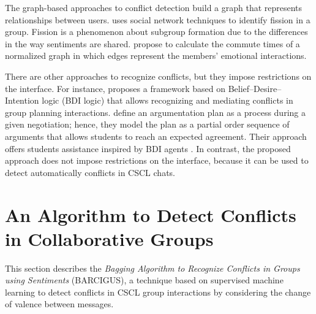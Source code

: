 \documentclass[3p,times,preprint]{elsarticle}
\begin{document}
{\textcolor{coolblack}{The graph-based approaches to conflict detection build a graph that represents relationships between users.  \cite{Zachary1977}  uses social network techniques to identify fission in a group. Fission is a phenomenon about subgroup formation due to the differences in the way sentiments are shared. \cite{Lescano2020} propose to calculate the commute times of a normalized graph in which edges represent the members’ emotional interactions.}%

There are other approaches to recognize conflicts, but they impose restrictions on the interface. For instance, %
\cite{Tedesco2003} proposes a framework based on Belief–Desire–Intention logic (BDI logic) that allows recognizing and mediating conflicts in group planning interactions. %
\cite{Monteserin2010} define an argumentation plan as a process during a given negotiation; hence, they model the plan as a partial order sequence of arguments that allows students to reach an expected agreement. Their approach offers students assistance inspired by BDI agents \citep{rao1995bdi}. In contrast, the proposed approach does not impose restrictions on the interface, because it can be used to detect automatically conflicts in CSCL chats.

}

\section{An Algorithm to Detect Conflicts in Collaborative Groups} \label{detecting}

This section describes the \textit{Bagging Algorithm to Recognize Conflicts in Groups using Sentiments} (BARCIGUS), a technique based on supervised machine learning to detect conflicts in CSCL group interactions by considering the change of valence between messages.


\end{document}
